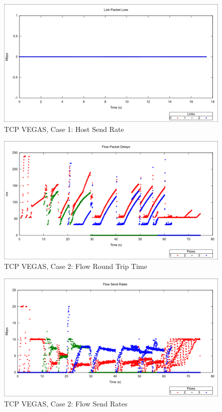 \begin{figure}[htbp]
    \centering
    \includegraphics[width=\textwidth]{vegas1/Link_Packet_Loss.png}
    \caption{TCP VEGAS, Case 1: Host Send Rate}
\end{figure}

\newpage
\clearpage


\begin{figure}[htbp]
    \centering
    \includegraphics[width=\textwidth]{vegas2/Flow_RTT.png}
    \caption{TCP VEGAS, Case 2: Flow Round Trip Time}
\end{figure}

\begin{figure}[htbp]
    \centering
    \includegraphics[width=\textwidth]{vegas2/Flow_Send_Rates.png}
    \caption{TCP VEGAS, Case 2: Flow Send Rates}
\end{figure}

